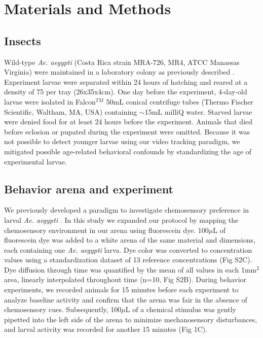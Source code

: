 \section*{Materials and Methods}

\subsection*{Insects}
\noindent Wild-type \textit{Ae. aegypti} (Costa Rica strain MRA-726, MR4, ATCC Manassas Virginia) were maintained in a laboratory colony as previously described \cite{Vinauger2014-rk}. Experiment larvae were separated within 24 hours of hatching and reared at a density of 75 per tray (26x35x4cm). One day before the experiment, 4-day-old larvae were isolated in Falcon${^{TM}}$ 50mL conical centrifuge tubes (Thermo Fischer Scientific, Waltham, MA, USA) containing ${\sim}$15mL milliQ water. Starved larvae were denied food for at least 24 hours before the experiment. Animals that died before eclosion or pupated during the experiment were omitted. Because it was not possible to detect younger larvae using our video tracking paradigm, we mitigated possible age-related behavioral confounds by standardizing the age of experimental larvae. 

\subsection*{Behavior arena and experiment}
\noindent We previously developed a paradigm to investigate chemosensory preference in larval \textit{Ae. aegypti} \cite{Bui2018-iq}. In this study we expanded our protocol by mapping the chemosensory environment in our arena using fluorescein dye. 100${\mu}$L of fluorescein dye was added to a white arena of the same material and dimensions, each containing one \textit{Ae. aegypti} larva. Dye color was converted to concentration values using a standardization dataset of 13 reference concentrations (Fig S2C). Dye diffusion through time was quantified by the mean of all values in each 1mm${^2}$ area, linearly interpolated throughout time (n=10, Fig S2B).  During behavior experiments, we recorded animals for 15 minutes before each experiment to analyze baseline activity and confirm that the arena was fair in the absence of chemosensory cues. Subsequently, 100${\mu}$L of a chemical stimulus was gently pipetted  into the left side of the arena to minimize mechanosensory disturbances, and larval activity was recorded for another 15 minutes (Fig 1C). 

